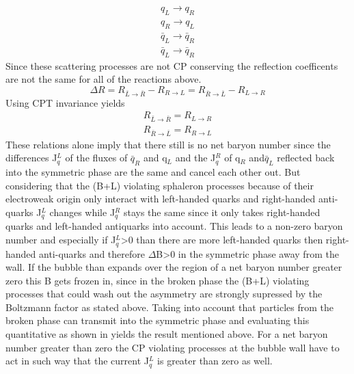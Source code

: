\begin{align*}
	q_L\rightarrow q_R\\
	q_R\rightarrow q_L\\
	\bar{q}_L\rightarrow \bar{q}_R\\
	\bar{q}_L\rightarrow \bar{q}_R
\end{align*}
Since these scattering processes are not CP conserving the reflection coefficents are not the same for all of the reactions above.
\begin{equation}
	\Delta R=R_{\bar{L}\rightarrow\bar{R}}-R_{R\rightarrow L}=R_{\bar{R}\rightarrow\bar{L}}-R_{L\rightarrow R}
	\label{reflection_coeff}
\end{equation}
Using CPT invariance yields
\begin{align}
	R_{\bar{L}\rightarrow\bar{R}}=R_{L\rightarrow R}\\
	R_{\bar{R}\rightarrow\bar{L}}=R_{R\rightarrow L}
\end{align}
These relations alone imply that there still is no net baryon number since the differences J$^L_q$ of the fluxes of $\bar{q}_R$ and q$_L$ and the  J$^R_q$ of q$_R$ and$\bar{q}_L$ reflected back into the symmetric phase are the same and cancel each other out. But considering that the (B+L) violating sphaleron processes because of their electroweak origin only interact with left-handed quarks and right-handed anti-quarks J$^L_q$ changes while  J$^R_q$ stays the same since it only takes right-handed quarks and left-handed antiquarks into account. This leads to a non-zero baryon number and especially if  J$^L_q$>0 than there are more left-handed quarks then right-handed anti-quarks and therefore $\Delta$B>0 in the symmetric phase away from the wall. If the bubble than expands over the region of a net baryon number greater zero this B gets frozen in, since in the broken phase the (B+L) violating processes that could wash out the asymmetry are strongly supressed by the Boltzmann factor as stated above. \newline
Taking into account that particles from the broken phase can transmit into the symmetric phase and evaluating this quantitative as shown in \cite[pp. 36-37]{Bernreuther:2002uj} yields the result mentioned above. For a net baryon number greater than zero the CP violating processes at the bubble wall have to act in such way that the current J$^L_q$ is greater than zero as well. 
